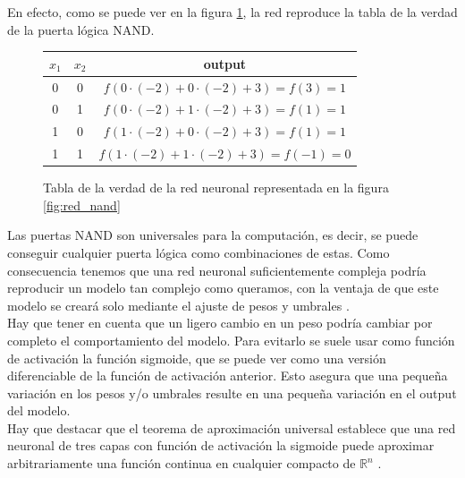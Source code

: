 \documentclass{article}
\begin{document}
En efecto, como se puede ver en la figura \ref{fig:tabla_verdad}, la red reproduce la tabla de la verdad de la puerta lógica NAND.\\
\begin{figure}[htbp]
\centering
\begin{tabular}{ |c|c|c| } 
 $x_1$ & $x_2$ & output \\ 
 \hline
 0 & 0 & $f(0\cdot (-2)+0\cdot (-2)+3)=f(3)=1$ \\ 
 0 & 1 & $f(0\cdot (-2)+1\cdot (-2)+3)=f(1)=1$ \\ 
 1 & 0 & $f(1\cdot (-2)+0\cdot (-2)+3)=f(1)=1$ \\ 
 1 & 1 & $f(1\cdot (-2)+1\cdot (-2)+3)=f(-1)=0$ 
\end{tabular}
\caption{Tabla de la verdad de la red neuronal representada en la figura \ref{fig:red_nand}}
\label{fig:tabla_verdad}
\end{figure}

Las puertas NAND son universales para la computación, es decir, se puede conseguir cualquier puerta lógica como combinaciones de estas. Como consecuencia tenemos que una red neuronal suficientemente compleja podría reproducir un modelo tan complejo como queramos, con la ventaja de que este modelo se creará solo mediante el ajuste de pesos y umbrales \cite{Neuralnetworksanddeeplearning-2019-12-27}.\\

Hay que tener en cuenta que un ligero cambio en un peso podría cambiar por completo el comportamiento del modelo. Para evitarlo se suele usar como función de activación la función sigmoide, que se puede ver como una versión diferenciable de la función de activación anterior. Esto asegura que una pequeña variación en los pesos y/o umbrales resulte en una pequeña variación en el output del modelo.\\

Hay que destacar que el teorema de aproximación universal establece que una red neuronal de tres capas con función de activación la sigmoide puede aproximar arbitrariamente una función continua en cualquier compacto de $\mathbb{R}^n $ \cite{UniversalapproximationtheoremWikipedia-2020-06-19}.
\end{document}
